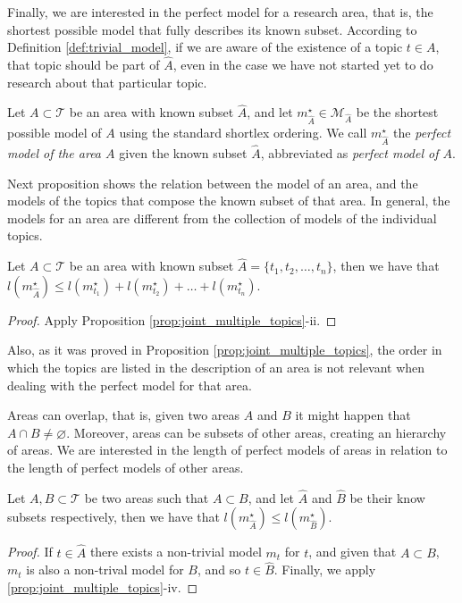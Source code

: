 Finally, we are interested in the perfect model for a research area, that is, the shortest possible model that fully describes its known subset. According to Definition \ref{def:trivial_model}, if we are aware of the existence of a topic $t \in A$, that topic should be part of $\hat{A}$, even in the case we have not started yet to do research about that particular topic.

\begin{definition}
Let $A \subset \mathcal{T}$ be an area with known subset $\hat{A}$, and let $m_{\hat{A}}^{\star} \in \mathcal{M}_{\hat{A}}$ be the shortest possible model of $A$ using the standard shortlex ordering. We call  $m_{\hat{A}}^{\star}$ the \emph{perfect model of the area $A$} given the known subset $\hat{A}$, abbreviated as \emph{perfect model of $A$}.
\end{definition}

Next proposition shows the relation between the model of an area, and the models of the topics that compose the known subset of that area. In general, the models for an area are different from the collection of models of the individual topics.

\begin{proposition}
Let $A \subset \mathcal{T}$ be an area with known subset $\hat{A} = \{t_1, t_2, \ldots, t_n\}$, then we have that $l \left( m_{\hat{A}}^{\star} \right) \leq l(m_ {t_1}^\star) + l(m_ {t_2}^\star) + \ldots + l(m_ {t_n}^\star)$.
\end{proposition}
\begin{proof}
Apply Proposition \ref{prop:joint_multiple_topics}-ii. 
\end{proof}

Also, as it was proved in Proposition \ref{prop:joint_multiple_topics}, the order in which the topics are listed in the description of an area is not relevant when dealing with the perfect model for that area.

Areas can overlap, that is, given two areas $A$ and $B$ it might happen that $A \cap B \neq \varnothing$. Moreover, areas can be subsets of other areas, creating an hierarchy of areas. We are interested in the length of perfect models of areas in relation to the length of perfect models of other areas.

\begin{proposition}
Let $A, B \subset \mathcal{T}$ be two areas such that $A \subset B$, and let $\hat{A}$ and $\hat{B}$ be their know subsets respectively, then we have that $l \left( m_{\hat{A}}^{\star} \right) \leq l \left( m_{\hat{B}}^{\star} \right)$.
\end{proposition}
\begin{proof}
If $t \in \hat{A}$ there exists a non-trivial model $m_t$ for $t$, and given that $A \subset B$, $m_t$ is also a non-trival model for $B$, and so $t \in \hat{B}$. Finally, we apply \ref{prop:joint_multiple_topics}-iv.
\end{proof}

